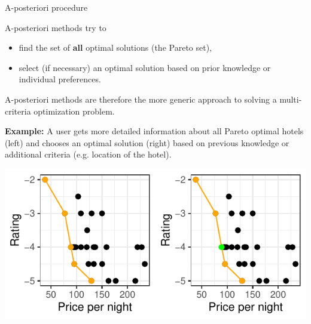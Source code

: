 \begin{frame}[allowframebreaks]{A-posteriori procedure}

A-posteriori methods try to

\begin{itemize}
\item find the set of \textbf{all} optimal solutions (the Pareto set),
\item select (if necessary) an optimal solution based on prior knowledge or individual preferences.
\end{itemize}

A-posteriori methods are therefore the more generic approach to solving a multi-criteria optimization problem.


\framebreak

\textbf{Example:} A user gets more detailed information about all Pareto optimal hotels (left) and chooses an optimal solution (right) based on previous knowledge or additional criteria (e.g. location of the hotel).

\vspace*{0.1cm}


\centering \includegraphics[scale=1]{images/expedia-11-1}


\end{frame}


